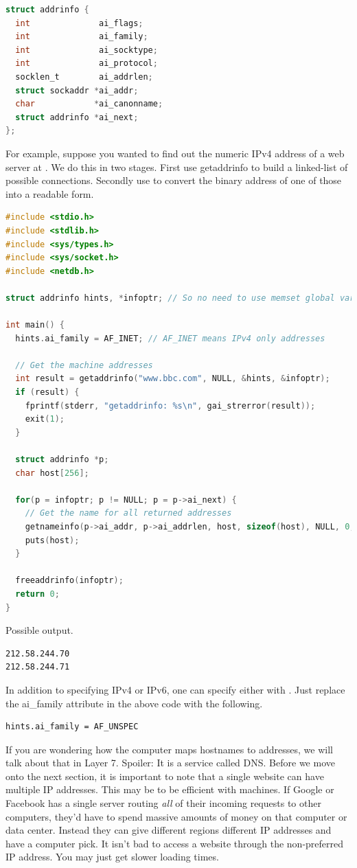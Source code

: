 \begin{lstlisting}[language=C]
struct addrinfo {
  int              ai_flags;
  int              ai_family;
  int              ai_socktype;
  int              ai_protocol;
  socklen_t        ai_addrlen;
  struct sockaddr *ai_addr;
  char            *ai_canonname;
  struct addrinfo *ai_next;
};
\end{lstlisting}

For example, suppose you wanted to find out the numeric IPv4 address of a web server at .
We do this in two stages.
First use getaddrinfo to build a linked-list of possible connections.
Secondly use  to convert the binary address of one of those into a readable form.

\begin{lstlisting}[language=C]
#include <stdio.h>
#include <stdlib.h>
#include <sys/types.h>
#include <sys/socket.h>
#include <netdb.h>

struct addrinfo hints, *infoptr; // So no need to use memset global variables

int main() {
  hints.ai_family = AF_INET; // AF_INET means IPv4 only addresses

  // Get the machine addresses
  int result = getaddrinfo("www.bbc.com", NULL, &hints, &infoptr);
  if (result) {
    fprintf(stderr, "getaddrinfo: %s\n", gai_strerror(result));
    exit(1);
  }

  struct addrinfo *p;
  char host[256];

  for(p = infoptr; p != NULL; p = p->ai_next) {
    // Get the name for all returned addresses
    getnameinfo(p->ai_addr, p->ai_addrlen, host, sizeof(host), NULL, 0, NI_NUMERICHOST);
    puts(host);
  }

  freeaddrinfo(infoptr);
  return 0;
}
\end{lstlisting}

Possible output.

\begin{lstlisting}
212.58.244.70
212.58.244.71
\end{lstlisting}

In addition to specifying IPv4 or IPv6, one can specify either with .
Just replace the ai\_family attribute in the above code with the following.

\begin{lstlisting}
hints.ai_family = AF_UNSPEC
\end{lstlisting}

If you are wondering how the computer maps \gls{hostnames} to addresses, we will talk about that in Layer 7.
Spoiler: It is a service called \gls{DNS}.
Before we move onto the next section, it is important to note that a single website can have multiple IP addresses.
This may be to be efficient with machines.
If Google or Facebook has a single server routing \textit{all} of their incoming requests to other computers, they'd have to spend massive amounts of money on that computer or data center.
Instead they can give different regions different IP addresses and have a computer pick.
It isn't bad to access a website through the non-preferred IP address.
You may just get slower loading times.

